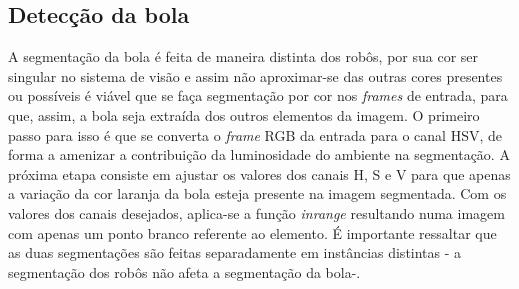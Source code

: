 \documentclass[conference, harvard, brazil, english]{sbatex}
\begin{document}
		\subsection{Detecção da bola}
		\par A segmentação da bola é feita de maneira distinta dos robôs, por sua cor ser singular no sistema de visão e assim não aproximar-se das outras cores presentes ou possíveis é viável que se faça segmentação por cor nos \textit{frames} de entrada, para que, assim, a bola seja extraída dos outros elementos da imagem. O primeiro passo para isso é que se converta o \textit{frame} RGB da entrada para o canal HSV, de forma a amenizar a contribuição da luminosidade do ambiente na segmentação. A próxima etapa consiste em ajustar os valores dos canais H, S e V para que apenas a variação da cor laranja da bola esteja presente na imagem segmentada. Com os valores dos canais desejados, aplica-se a função \textit{inrange} resultando numa imagem com apenas um ponto branco referente ao elemento. É importante ressaltar que as duas segmentações são feitas separadamente em instâncias distintas - a segmentação dos robôs não afeta a segmentação da bola-.
\end{document}
